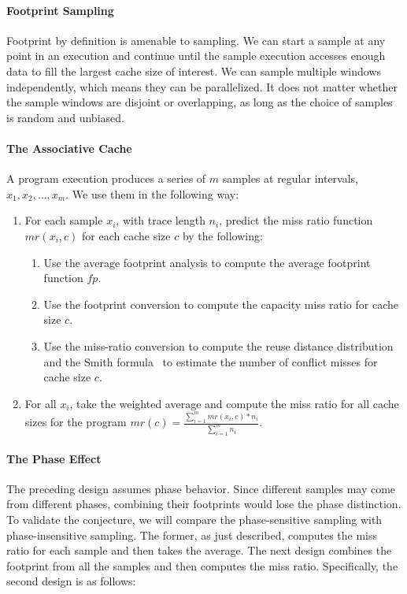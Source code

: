 \paragraph{Footprint Sampling}
Footprint by definition is amenable to sampling.  We can start a
sample at any point in an execution and continue until the
sample execution accesses enough data to fill the largest cache size
of interest.  We can sample multiple windows independently, which
means they can be parallelized.  It does not matter whether the sample
windows are disjoint or overlapping, as long as the choice of samples
is random and unbiased.  

\paragraph{The Associative Cache}
A program execution produces a series of $m$
samples at regular intervals, $x_1,x_2,\dots,x_m$.  We use them in
the following way:

\begin{enumerate}
\item For each sample $x_i$, with trace length $n_i$, predict the miss ratio function $mr(x_i, c)$ for
  each cache size $c$ by the following:
  \begin{enumerate}
  \item Use the average footprint analysis to compute the average
    footprint function $fp$. 
  \item Use the footprint conversion to compute the capacity miss
    ratio for cache size $c$.
  \item Use the miss-ratio conversion to compute the reuse distance
    distribution and the Smith formula~\cite{Smith:ICSE76} to estimate the
    number of conflict misses for cache size $c$.
  \end{enumerate}
\item For all $x_i$, take the weighted average and compute the miss ratio
  for all cache sizes for the program $mr(c) = \frac{\sum_{i=1}^{m}mr(x_i, c) * n_i}{\sum_{i=1}^{m}n_i}$.
\end{enumerate}

\paragraph{The Phase Effect}
The preceding design assumes phase behavior.  Since different samples
may come from different phases, combining their footprints would lose
the phase distinction.  To validate the conjecture, we will
compare the phase-sensitive sampling with phase-insensitive sampling.
The former, as just described, computes the miss ratio for each sample
and then takes the average.  The next design combines the footprint from
all the samples and then computes the miss ratio.  Specifically, the
second design is as follows:

